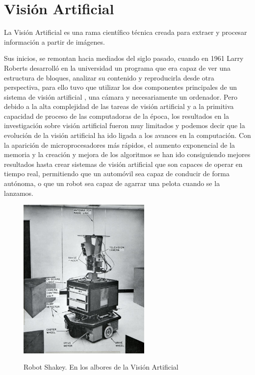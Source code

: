 \section{Visión Artificial}
La Visión Artificial es una rama científico técnica creada para extraer y procesar información a partir de imágenes.

Sus inicios, se remontan hacia mediados del siglo pasado, cuando en 1961 Larry Roberts desarrolló en la universidad un programa que era capaz de ver una estructura de bloques, analizar su contenido y reproducirla desde otra perspectiva, para ello tuvo que utilizar los dos componentes principales de un sistema de visión artificial , una cámara y necesariamente un ordenador. Pero debido a la alta complejidad de las tareas de visión artificial y a la primitiva capacidad de proceso  de las computadoras de la época, los resultados en la investigación sobre visión artificial fueron muy limitados y podemos decir que la evolución de la visión artificial ha ido ligada a los avances en la computación. Con la aparición de microprocesadores más rápidos, el aumento exponencial de la memoria y la creación y mejora de los algoritmos  se han ido consiguiendo mejores resultados hasta crear sistemas de visión artificial que son capaces de operar en tiempo real, permitiendo que un automóvil sea capaz de conducir de forma autónoma, o que un robot sea capaz de agarrar una pelota cuando se la lanzamos.

\begin{figure}[htbp]
\begin{center}
\label{fig:RobotShakey}\includegraphics[height=8.0cm]{img/cap2/RobotShakey.jpg}
\end{center}
\caption{Robot Shakey. En los albores de la Visión Artificial}
\end{figure}



